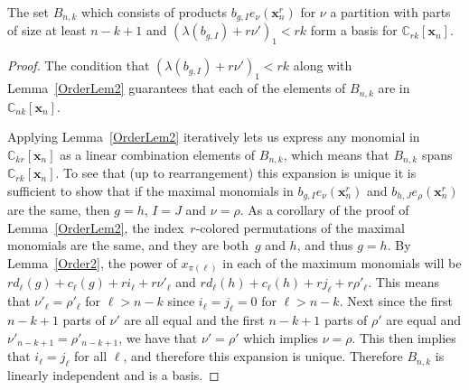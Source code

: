 \documentclass[ALCO,ThmDefs,Unicode,epreuves]{cedram}
\begin{document}
\begin{prop}
\label{BasisProp2}

	The set $B_{n,k}$ which consists of products $b_{g,I}e_\nu(\mathbf{x}_n^r)$ for $\nu$ a partition with parts of size at 
least $n-k+1$ and $(\lambda(b_{g,I})+r\nu')_1<rk$ form a basis for $\mathbb{C}_{rk}[\mathbf{x}_n]$.
	\begin{proof}

The condition that $(\lambda(b_{g,I})+r\nu')_1<rk$ along with Lemma~\ref{OrderLem2} guarantees that each of the elements of 
$B_{n,k}$ are in $\mathbb{C}_{nk}[\mathbf{x}_n]$.

Applying Lemma~\ref{OrderLem2} iteratively lets us express any monomial in $\mathbb{C}_{kr}[\mathbf{x}_n]$ as a linear 
combination elements of $B_{n,k}$, which means that $B_{n,k}$ spans $\mathbb{C}_{rk}[\mathbf{x}_n]$. To see that (up to 
rearrangement) this expansion is unique it is sufficient to show that if the maximal monomials in 
$b_{g,I}e_{\nu}(\mathbf{x}_n^r)$ and $b_{h,J}e_{\rho}(\mathbf{x}_n^r)$ are the same, then $g=h$, $I=J$ and $\nu=\rho$. As a 
corollary of the proof of Lemma~\ref{OrderLem2}, the index~$r$-colored permutations of the maximal monomials are the same, 
and they are both~$g$ and $h$, and thus $g=h$. By Lemma~\ref{Order2}, the power of $x_{\pi(\ell)}$ in each of the maximum 
monomials will be $rd_\ell(g)+c_\ell(g)+ri_\ell+r\nu'_\ell$ and $rd_\ell(h)+c_\ell(h)+rj_\ell+r\rho'_\ell$. This means that 
$\nu'_\ell=\rho'_\ell$ for $\ell>n-k$ since $i_\ell=j_\ell=0$ for $\ell>n-k$. Next since the first $n-k+1$ parts of $\nu'$ 
are all equal and the first $n-k+1$ parts of $\rho'$ are equal and $\nu'_{n-k+1}=\rho'_{n-k+1}$, we have that $\nu'=\rho'$ 
which implies $\nu=\rho$. This then implies that $i_\ell=j_\ell$ for all $\ell$, and therefore this expansion is unique. 
Therefore $B_{n,k}$ is linearly independent and is a basis.
	\end{proof}

\end{prop}
	
\end{document}
